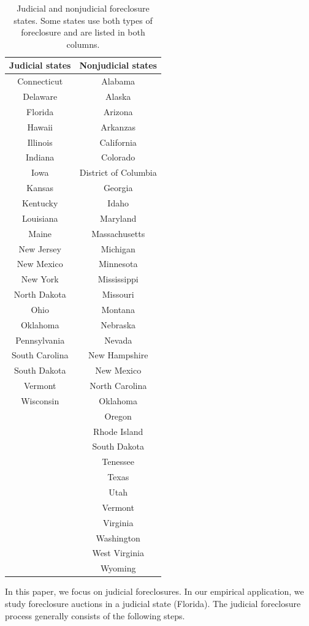 \documentclass[11pt,twopage]{article}
\begin{document}
\begin{table}[t!]
\centering
\begin{tabular}{c c} 
 \hline
Judicial states & Nonjudicial states  \\ [0.5ex] 
 \hline
 Connecticut & Alabama  \\ 
 Delaware & Alaska  \\
 Florida & Arizona \\
Hawaii & Arkanzas  \\
 Illinois & California  \\
 Indiana & Colorado \\
 Iowa & District of Columbia\\
 Kansas & Georgia \\
 Kentucky & Idaho \\
 Louisiana & Maryland\\
 Maine & Massachusetts \\
 New Jersey & Michigan\\
 New Mexico & Minnesota\\
 New York & Mississippi\\
 North Dakota & Missouri\\
 Ohio & Montana\\
 Oklahoma & Nebraska \\
 Pennsylvania & Nevada \\
 South Carolina & New Hampshire\\
 South Dakota & New Mexico\\
 Vermont & North Carolina\\
 Wisconsin & Oklahoma\\
 & Oregon \\
 & Rhode Island \\
 & South Dakota \\
 & Tenessee \\
 & Texas \\
 & Utah \\
 & Vermont \\
 & Virginia \\
 & Washington \\
 & West Virginia \\
 & Wyoming \\
  [1ex] 
 \hline
\end{tabular}
\caption{Judicial and nonjudicial foreclosure states. Some states use both types of foreclosure and are listed in both columns.}
\label{tbl:judicial}
\end{table}

In this paper, we focus on judicial foreclosures. In our empirical application, we study foreclosure auctions in a judicial state (Florida). The judicial foreclosure process generally consists of the following steps. 
\end{document}
